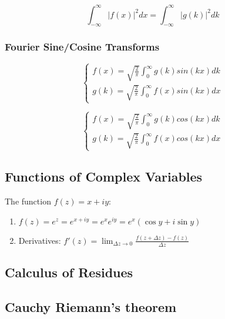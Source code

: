 \documentclass[]{article}
\begin{document}
\begin{equation}
    \label{fourier_xform_normalized}
    \int_{-\infty}^{\infty}{|f(x)|^2dx} = \int_{-\infty}^{\infty}{|g(k)|^2dk}
\end{equation}

\subsubsection{Fourier Sine/Cosine Transforms}

\begin{equation}
    \label{fourier_xform_sin}
    \begin{cases}
        f(x) = \sqrt{\frac{2}{\pi}}\int_0^{\infty}{g(k)sin(kx)dk}\\
        g(k) = \sqrt{\frac{2}{\pi}}\int_0^{\infty}{f(x)sin(kx)dx}
    \end{cases}
\end{equation}


\begin{equation}
    \label{fourier_xform_cos}
    \begin{cases}
        f(x) = \sqrt{\frac{2}{\pi}}\int_0^{\infty}{g(k)cos(kx)dk}\\
        g(k) = \sqrt{\frac{2}{\pi}}\int_0^{\infty}{f(x)cos(kx)dx}
    \end{cases}
\end{equation}

\subsection{Functions of Complex Variables}
The function $f(z)= x+iy$: 
\begin{enumerate}
    \item $f(z)=e^z=e^{x+iy}=e^{x}e^{iy}= e^x(\cos{y}+i\sin
    y)$
    \item Derivatives: $f'(z)= \lim_{\Delta z\to 0} \frac{f(z+\Delta z)-f(z)}{\Delta z}$
 \end{enumerate}


\subsection{Calculus of Residues}

\subsection{Cauchy Riemann's theorem}
\end{document}
